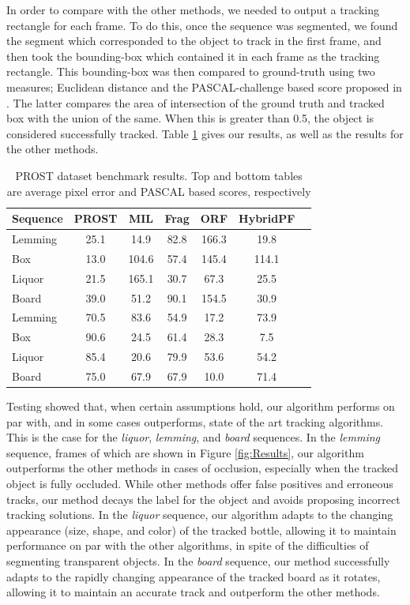 In order to compare with the other methods, we needed to output a tracking rectangle for each frame. To do this, once the sequence was segmented, we found the segment which corresponded to the object to track in the first frame, and then took the bounding-box which contained it in each frame as the tracking rectangle. This bounding-box was then compared to ground-truth using two measures; Euclidean distance and the PASCAL-challenge based score proposed in \cite{PROST}. The latter compares the area of intersection of the ground truth and tracked box with the union of the same. When this is greater than 0.5, the object is considered successfully tracked. Table \ref{table:results} gives our results, as well as the results for the other methods.
 
 \begin{table}
 \caption[PROST dataset benchmark results]{PROST dataset benchmark results. Top and bottom tables are average pixel error and PASCAL based scores, respectively}
\begin{center}
\begin{tabular}{|l|c|c|c|c|c|c|}
\hline
Sequence &  PROST  & MIL & Frag & ORF & HybridPF \\
\hline\hline
Lemming & 25.1 & 14.9 & 82.8 & 166.3 & 19.8\\
Box & 13.0 & 104.6 & 57.4 & 145.4 & 114.1\\
Liquor & 21.5 & 165.1 & 30.7 & 67.3 & 25.5\\
Board & 39.0 & 51.2 & 90.1 & 154.5 & 30.9\\
\hline
\hline
\hline\hline
Lemming & 70.5 & 83.6 & 54.9 & 17.2 & 73.9\\
Box & 90.6 & 24.5 & 61.4 & 28.3 & 7.5\\
Liquor & 85.4 & 20.6 & 79.9 & 53.6 & 54.2\\
Board & 75.0 & 67.9 & 67.9 & 10.0 & 71.4\\
\hline
\end{tabular}
\end{center}

\label{table:results}

\end{table}


Testing showed that, when certain assumptions hold, our algorithm performs on par with, and in some cases outperforms, state of the art tracking algorithms. This is the case for the \textit{liquor}, \textit{lemming}, and \textit{board} sequences. In the \textit{lemming} sequence, frames of which are shown in Figure \ref{fig:Results}, our algorithm outperforms the other methods in cases of occlusion, especially when the tracked object is fully occluded. While other methods offer false positives and erroneous tracks, our method decays the label for the object and avoids proposing incorrect tracking solutions. In the \textit{liquor} sequence, our algorithm adapts to the changing appearance (size, shape, and color) of the tracked bottle, allowing it to maintain performance on par with the other algorithms, in spite of the difficulties of segmenting transparent objects. In the \textit{board} sequence, our method successfully adapts to the rapidly changing appearance of the tracked board as it rotates, allowing it to maintain an accurate track and outperform the other methods.


